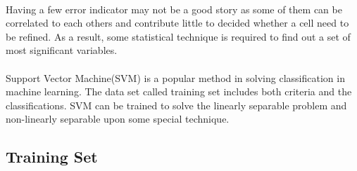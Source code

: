 \paragraph{}
Having a few error indicator may not be a good story as some of them can be correlated to each others and contribute little to decided whether a cell need to be refined.
As a result, some statistical technique is required to find out a set of most significant variables.

\paragraph{}
Support Vector Machine(SVM) is a popular method in solving classification in machine learning.
The data set called training set includes both criteria and the classifications.
SVM can be trained to solve the linearly separable problem and non-linearly separable upon some special technique.


\subsection{Training Set}
